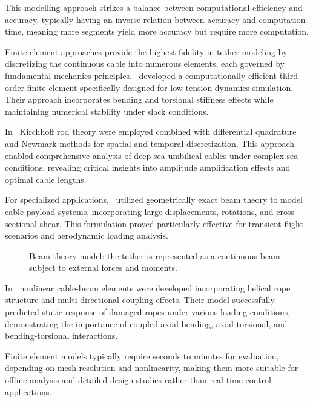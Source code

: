 This modelling approach strikes a balance between computational efficiency and accuracy, typically
having an inverse relation between accuracy and computation time, meaning more segments yield more
accuracy but require more computation.

Finite element approaches provide the highest fidelity in tether modeling by discretizing the
continuous cable into numerous elements, each governed by fundamental mechanics
principles.~\cite{buckhamDevelopmentFiniteElement2004} developed a computationally efficient
third-order finite element specifically designed for low-tension dynamics simulation. Their
approach incorporates bending and torsional stiffness effects while maintaining numerical stability
under slack conditions.

In~\cite{chenDynamicCharacteristicsDeepsea2021} Kirchhoff rod theory were employed combined with
differential quadrature and Newmark methods for spatial and temporal discretization. This approach
enabled comprehensive analysis of deep-sea umbilical cables under complex sea conditions, revealing
critical insights into amplitude amplification effects and optimal cable lengths.

For specialized applications,~\cite{dehadraiTransientPlanarDynamics2022} utilized geometrically
exact beam theory to model cable-payload systems, incorporating large displacements, rotations, and
cross-sectional shear. This formulation proved particularly effective for transient flight
scenarios and aerodynamic loading analysis.

\begin{figure}[b]
	\centering
	\caption{
		Beam theory model: the tether is represented as a continuous beam subject to external forces and
		moments.
	}
	\label{sota_sm_tm_beam_theory}
\end{figure}

In~\cite{beltranEvaluationCoupledEffect2020} nonlinear cable-beam elements were developed
incorporating helical rope structure and multi-directional coupling effects. Their model
successfully predicted static response of damaged ropes under various loading conditions,
demonstrating the importance of coupled axial-bending, axial-torsional, and bending-torsional
interactions.

Finite element models typically require seconds to minutes for evaluation, depending on mesh
resolution and nonlinearity, making them more suitable for offline analysis and detailed design
studies rather than real-time control applications.


